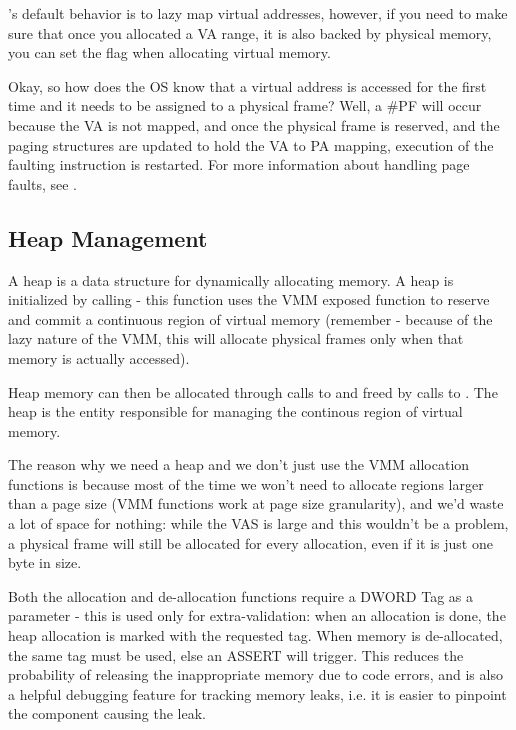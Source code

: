 \begin{appendices}
\projectname's default behavior is to lazy map virtual addresses, however, if you need to make sure
that once you allocated a VA range, it is also backed by physical memory, you can set the
 flag when allocating virtual memory.

Okay, so how does the OS know that a virtual address is accessed for the first time and it needs to
be assigned to a physical frame? Well, a \#PF will occur because the VA is not mapped, and once the
physical frame is reserved, and the paging structures are updated to hold the VA to PA mapping,
execution of the faulting instruction is restarted. For more information about handling page faults,
see .

\subsection{Heap Management}

A heap is a data structure for dynamically allocating memory. A heap is initialized by calling
 - this function uses the VMM exposed function  to
reserve and commit a continuous region of virtual memory (remember - because of the lazy nature of
the VMM, this will allocate physical frames only when that memory is actually accessed).

Heap memory can then be allocated through calls to  and freed by calls
to . The heap is the entity responsible for managing the continous region
of virtual memory.

The reason why we need a heap and we don't just use the VMM allocation functions is because most of
the time we won't need to allocate regions larger than a page size (VMM functions work at page size
granularity), and we'd waste a lot of space for nothing: while the VAS is large and this wouldn't be
a problem, a physical frame will still be allocated for every allocation, even if it is just one byte
in size.

Both the allocation and de-allocation functions require a DWORD Tag as a parameter - this is used
only for extra-validation: when an allocation is done, the heap allocation is marked with the
requested tag. When memory is de-allocated, the same tag must be used, else an ASSERT will trigger.
This reduces the probability of releasing the inappropriate memory due to code errors, and is also a
helpful debugging feature for tracking memory leaks, i.e. it is easier to pinpoint the component
causing the leak.


\end{appendices}
